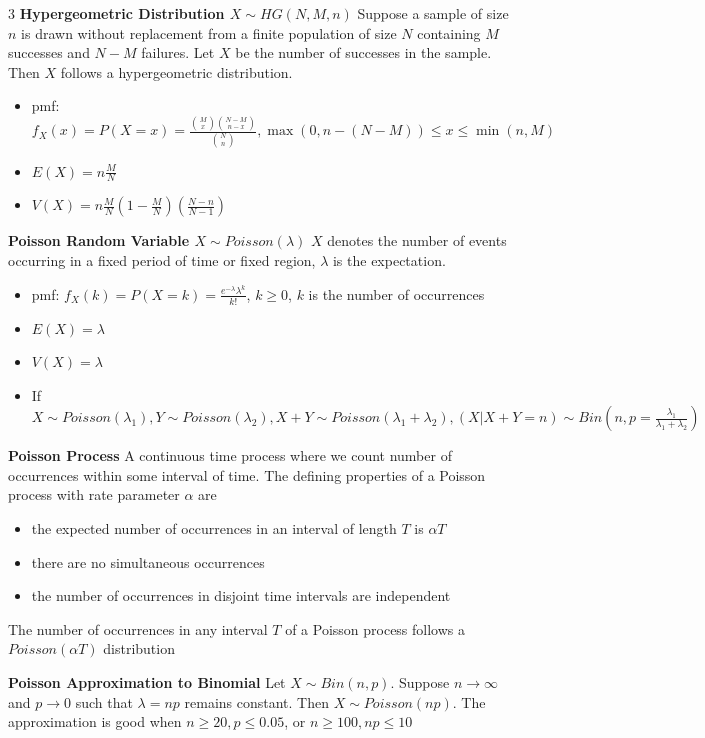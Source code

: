 \documentclass[10pt, landscape]{article}
\begin{document}
\begin{multicols*}{3}
\textbf{Hypergeometric Distribution $X\sim HG(N, M, n)$} 
Suppose a sample of size $n$ is drawn without replacement from a finite population of size $N$ containing $M$ successes and $N-M$ failures. Let $X$ be the number of successes in the sample. Then $X$ follows a hypergeometric distribution.
\begin{itemize}
    \item pmf: $f_X(x)=P(X=x)=\frac{\binom{M}{x}\binom{N-M}{n-x}}{\binom{N}{n}}, \max(0, n-(N-M)) \le x \le \min(n, M)$
    \item $E(X)=n\frac{M}{N}$
    \item $V(X)=n\frac{M}{N}\left(1-\frac{M}{N}\right)\left(\frac{N-n}{N-1}\right)$
\end{itemize}

\textbf{Poisson Random Variable $X \sim Poisson(\lambda)$} $X$ denotes the number of events occurring in a fixed period of time or fixed region, $\lambda$ is the expectation.
\begin{itemize}
    \item pmf: $f_X(k)=P(X=k)=\frac{e^{-\lambda}\lambda^k}{k!}$, $k \geq 0$, $k$ is the number of occurrences
    \item $E(X)=\lambda$
    \item $V(X)=\lambda$
    \item If $X \sim Poisson(\lambda_1), Y \sim Poisson(\lambda_2), X+Y \sim Poisson(\lambda_1+\lambda_2), (X | X+Y=n) \sim Bin(n, p=\frac{\lambda_1}{\lambda_1+\lambda_2})$
\end{itemize}

\textbf{Poisson Process} A continuous time process where we count number of occurrences within some interval of time. The defining properties of a Poisson process with rate parameter $\alpha$ are
\begin{itemize}
    \item the expected number of occurrences in an interval of length $T$ is $\alpha T$
    \item there are no simultaneous occurrences
    \item the number of occurrences in disjoint time intervals are independent
\end{itemize}
The number of occurrences in any interval $T$ of a Poisson process follows a $Poisson(\alpha T)$ distribution

\textbf{Poisson Approximation to Binomial} Let $X \sim Bin(n, p)$. Suppose $n \rightarrow \infty$ and $p \rightarrow 0$ such that $\lambda=np$ remains constant. Then $X \sim Poisson(np)$. The approximation is good when $n \geq 20, p \leq 0.05$, or $n \geq 100, np \leq 10$


\end{multicols*}
\end{document}
